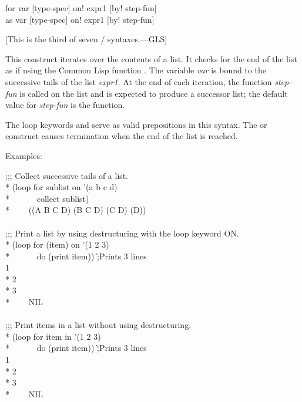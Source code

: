 \begin{defloop}
for var [type-spec] \!on! expr1 [\!by! step-fun] \\
as var [type-spec] \!on! expr1 [\!by! step-fun]

[This is the third of seven / syntaxes.---GLS]

This construct iterates over the contents of a list. It checks for the
end of the list as if using the Common Lisp function 
.  
The variable {\it var\/} is bound to the successive tails of the list
{\it expr1}.  At the end of each iteration, the function {\it step-fun\/}
is called on the list and is expected to produce a successor list;
the default value for {\it step-fun\/} is the  function.

The loop keywords  and  serve as valid
prepositions in this syntax.
The  or  construct causes termination when the
end of the list is reached.

Examples:
\begin{lisp}
;;; Collect successive tails of a list. \\*
(loop for sublist on '(a b c d) \\*
~~~~~~collect sublist) \\*
~~~\EV~((A B C D) (B C D) (C D) (D)) \\
 \\
;;; Print a list by using destructuring with the loop keyword ON. \\*
(loop for (item) on '(1 2 3) \\*
~~~~~~do (print item))  \`;{\rm Prints 3 lines}\\
1  \\*
2  \\*
3  \\*
~~~\EV~NIL \\
 \\
;;; Print items in a list without using destructuring. \\*
(loop for item in '(1 2 3) \\*
~~~~~~do (print item))  \`;{\rm Prints 3 lines}\\
1  \\*
2  \\*
3  \\*
~~~\EV~NIL
\end{lisp}
\end{defloop}

